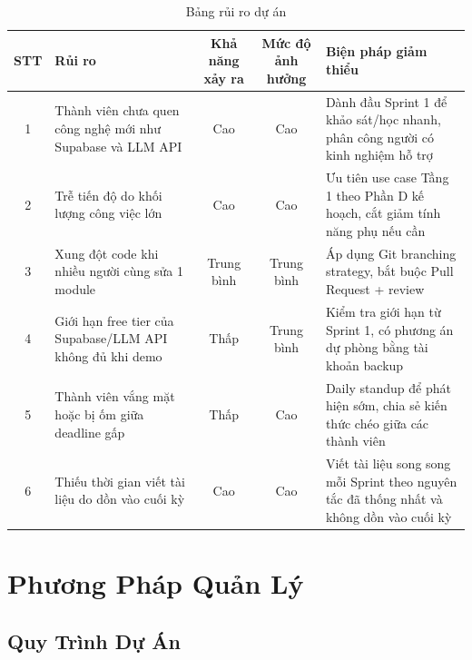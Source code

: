 \begin{table}[H]
  \centering
  \begin{tabularx}{\textwidth}{|c|>{\raggedright\arraybackslash}X|c|c|>{\raggedright\arraybackslash}X|}
    \hline
    \textbf{STT} & \textbf{Rủi ro} & \textbf{Khả năng xảy ra} & \textbf{Mức độ ảnh hưởng} & \textbf{Biện pháp giảm thiểu} \\
    \hline
    1 & Thành viên chưa quen công nghệ mới như Supabase và LLM API & Cao & Cao & Dành đầu Sprint 1 để khảo sát/học nhanh, phân công người có kinh nghiệm hỗ trợ \\ \hline
    2 & Trễ tiến độ do khối lượng công việc lớn & Cao & Cao & Ưu tiên use case Tầng 1 theo Phần D kế hoạch, cắt giảm tính năng phụ nếu cần \\ \hline
    3 & Xung đột code khi nhiều người cùng sửa 1 module & Trung bình & Trung bình & Áp dụng Git branching strategy, bắt buộc Pull Request + review \\ \hline
    4 & Giới hạn free tier của Supabase/LLM API không đủ khi demo & Thấp & Trung bình & Kiểm tra giới hạn từ Sprint 1, có phương án dự phòng bằng tài khoản backup \\ \hline
    5 & Thành viên vắng mặt hoặc bị ốm giữa deadline gấp & Thấp & Cao & Daily standup để phát hiện sớm, chia sẻ kiến thức chéo giữa các thành viên \\ \hline
    6 & Thiếu thời gian viết tài liệu do dồn vào cuối kỳ & Cao & Cao & Viết tài liệu song song mỗi Sprint theo nguyên tắc đã thống nhất và không dồn vào cuối kỳ \\
    \hline
  \end{tabularx}
  \caption{Bảng rủi ro dự án}
  \label{tab:risks}
\end{table}

\section{Phương Pháp Quản Lý}

\subsection{Quy Trình Dự Án}

